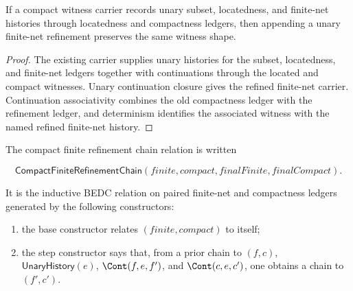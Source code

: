 \begin{theorem}
\label{thm:compact-witness-carrier-finite-extension-closed}
If a compact witness carrier records unary subset, locatedness, and finite-net
histories through locatedness and compactness ledgers, then appending a unary
finite-net refinement preserves the same witness shape.
\end{theorem}
\begin{proof}
The existing carrier supplies unary histories for the subset, locatedness, and
finite-net ledgers together with continuations through the located and compact
witnesses. Unary continuation closure gives the refined finite-net carrier.
Continuation associativity combines the old compactness ledger with the
refinement ledger, and determinism identifies the associated witness with the
named refined finite-net history.
\end{proof}
\begin{definition}
\label{def:compact-finite-refinement-chain}
The compact finite refinement chain relation is written

$$
\mathsf{CompactFiniteRefinementChain}(finite,compact,finalFinite,finalCompact).
$$

It is the inductive BEDC relation on paired finite-net and compactness ledgers
generated by the following constructors:
\begin{enumerate}
  \item the base constructor relates $(finite,compact)$ to itself;
  \item the step constructor says that, from a prior chain to $(f,c)$,
  $\mathsf{UnaryHistory}(e)$, $\Cont(f,e,f')$, and $\Cont(c,e,c')$,
  one obtains a chain to $(f',c')$.
\end{enumerate}
\end{definition}

